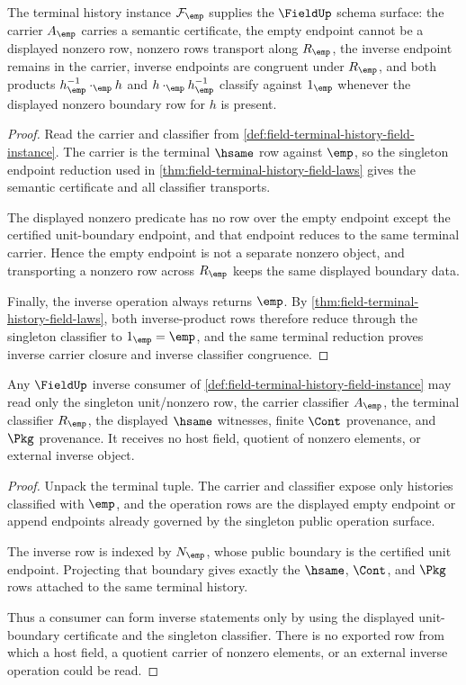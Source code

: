 \begin{theorem}
\label{thm:field-terminal-history-schema-laws}
The terminal history instance $\mathcal F_{\emp}$ supplies the $\FieldUp$
schema surface: the carrier $A_{\emp}$ carries a semantic certificate, the
empty endpoint cannot be a displayed nonzero row, nonzero rows transport along
$R_{\emp}$, the inverse endpoint remains in the carrier, inverse endpoints are
congruent under $R_{\emp}$, and both products
$h^{-1}_{\emp}\cdot_{\emp}h$ and $h\cdot_{\emp}h^{-1}_{\emp}$ classify
against $1_{\emp}$ whenever the displayed nonzero boundary row for $h$ is
present.
\end{theorem}
\begin{proof}
Read the carrier and classifier from
\autoref{def:field-terminal-history-field-instance}. The carrier is the
terminal $\hsame$ row against $\emp$, so the singleton endpoint reduction used
in \autoref{thm:field-terminal-history-field-laws} gives the semantic
certificate and all classifier transports.

The displayed nonzero predicate has no row over the empty endpoint except the
certified unit-boundary endpoint, and that endpoint reduces to the same
terminal carrier. Hence the empty endpoint is not a separate nonzero object,
and transporting a nonzero row across $R_{\emp}$ keeps the same displayed
boundary data.

Finally, the inverse operation always returns $\emp$. By
\autoref{thm:field-terminal-history-field-laws}, both inverse-product rows
therefore reduce through the singleton classifier to $1_{\emp}=\emp$, and the
same terminal reduction proves inverse carrier closure and inverse classifier
congruence.
\end{proof}

\begin{theorem}
\label{thm:field-terminal-nonzero-boundary}
Any $\FieldUp$ inverse consumer of
\autoref{def:field-terminal-history-field-instance} may read only the singleton
unit/nonzero row, the carrier classifier $A_{\emp}$, the terminal classifier
$R_{\emp}$, the displayed $\hsame$ witnesses, finite $\Cont$ provenance, and
$\Pkg$ provenance. It receives no host field, quotient of nonzero elements, or
external inverse object.
\end{theorem}
\begin{proof}
Unpack the terminal tuple. The carrier and classifier expose only histories
classified with $\emp$, and the operation rows are the displayed empty endpoint
or append endpoints already governed by the singleton public operation
surface.

The inverse row is indexed by $N_{\emp}$, whose public boundary is the
certified unit endpoint. Projecting that boundary gives exactly the
$\hsame$, $\Cont$, and $\Pkg$ rows attached to the same terminal history.

Thus a consumer can form inverse statements only by using the displayed
unit-boundary certificate and the singleton classifier. There is no exported
row from which a host field, a quotient carrier of nonzero elements, or an
external inverse operation could be read.
\end{proof}

